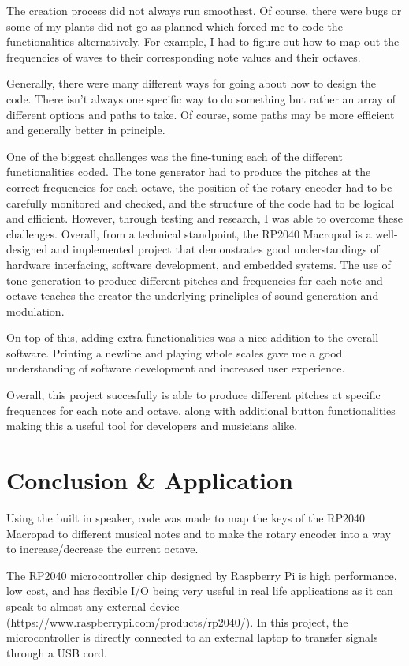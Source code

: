 \documentclass{article}
\begin{document}
The creation process did not always run smoothest. Of course, there were bugs or some of my plants did not go as planned which forced me to code the functionalities alternatively. For example, I had to figure out how to map out the frequencies of waves to their corresponding note values and their octaves.

Generally, there were many different ways for going about how to design the code. There isn't always one specific way to do something but rather an array of different options and paths to take. Of course, some paths may be more efficient and generally better in principle. 

One of the biggest challenges was the fine-tuning each of the different functionalities coded. The tone generator had to produce the pitches at the correct frequencies for each octave, the position of the rotary encoder had to be carefully monitored and checked, and the structure of the code had to be logical and efficient. However, through testing and research, I was able to overcome these challenges. Overall, from a technical standpoint, the RP2040 Macropad is a well-designed and implemented project that demonstrates good understandings of hardware interfacing, software development, and embedded systems. The use of tone generation to produce different pitches and frequencies for each note and octave teaches the creator the underlying princliples of sound generation and modulation.

On top of this, adding extra functionalities was a nice addition to the overall software. Printing a newline and playing whole scales gave me a good understanding of software development and increased user experience. 

Overall, this project succesfully is able to produce different pitches at specific frequences for each note and octave, along with additional button functionalities making this a useful tool for developers and musicians alike. 

\section{Conclusion \& Application}

Using the built in speaker, code was made to map the keys of the RP2040 Macropad to different musical notes and to make the rotary encoder into a way to increase/decrease the current octave.

The RP2040 microcontroller chip designed by Raspberry Pi is high performance, low cost, and has flexible I/O being very useful in real life applications as it can speak to almost any external device (https://www.raspberrypi.com/products/rp2040/). In this project, the microcontroller is directly connected to an external laptop to transfer signals through a USB cord. 
\end{document}
